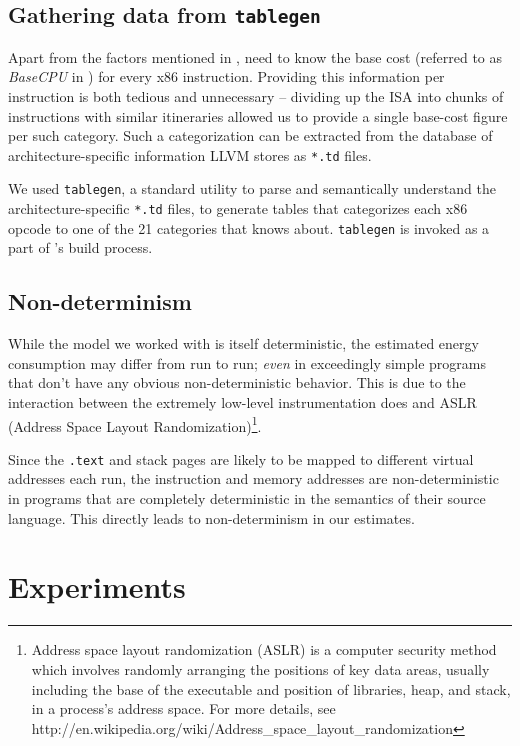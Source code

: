 \subsection{Gathering data from \texttt{tablegen}}
\label{sec:pintool-tablegen}

Apart from the factors mentioned in , \wattage need
to know the base cost (referred to as \textit{BaseCPU} in
\cite{steinke}) for every x86 instruction.  Providing this information
per instruction is both tedious and unnecessary -- dividing up the ISA
into chunks of instructions with similar itineraries allowed us to
provide a single base-cost figure per such category.  Such a
categorization can be extracted from the database of
architecture-specific information LLVM stores as \texttt{*.td} files.

We used \texttt{tablegen}, a standard utility to parse and
semantically understand the architecture-specific \texttt{*.td} files,
to generate tables that categorizes each x86 opcode to one of the 21
categories that \wattage knows about.  \texttt{tablegen} is invoked as
a part of \wattage's build process.

\subsection{Non-determinism}

While the model we worked with is itself deterministic, the estimated
energy consumption may differ from run to run; \textit{even} in
exceedingly simple programs that don't have any obvious
non-deterministic behavior.  This is due to the interaction between
the extremely low-level instrumentation \wattage does and ASLR
(Address Space Layout Randomization)\footnote{ Address space layout
  randomization (ASLR) is a computer security method which involves
  randomly arranging the positions of key data areas, usually
  including the base of the executable and position of libraries,
  heap, and stack, in a process's address space.  For more details,
  see
  http://en.wikipedia.org/wiki/Address\_space\_layout\_randomization}.

Since the \texttt{.text} and stack pages are likely to be mapped to
different virtual addresses each run, the instruction and memory
addresses are non-deterministic in programs that are completely
deterministic in the semantics of their source language.  This
directly leads to non-determinism in our estimates.

\section{Experiments}

